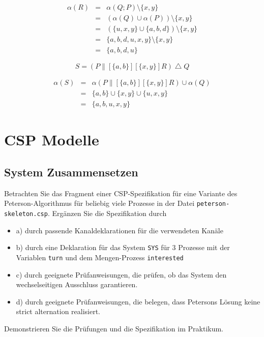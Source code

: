 \documentclass{scrreprt}
\begin{document}
\begin{eqnarray*}
  \alpha(R) &=& \alpha(Q; P) \setminus \{x, y\} \\
            &=& (\alpha(Q) \cup \alpha(P)) \setminus \{x, y\} \\
            &=& (\{u, x, y\} \cup \{a, b, d\}) \setminus \{x, y\} \\
            &=& \{a, b, d, u, x, y\} \setminus \{x, y\} \\
            &=& \{a, b, d, u\}
\end{eqnarray*}

\begin{equation}
  S = (P \parallel[\{a, b\}][\{x, y\}] R) \bigtriangleup Q
\end{equation}

\begin{eqnarray*}
  \alpha(S) &=& \alpha(P \parallel[\{a, b\}][\{x, y\}] R) \cup \alpha(Q) \\
            &=& \{a, b\} \cup \{x, y\} \cup \{u, x, y\} \\
            &=& \{a, b, u, x, y\}
\end{eqnarray*}


\chapter{CSP Modelle}
\section{System Zusammensetzen}

Betrachten Sie das Fragment einer CSP-Spezifikation für eine Variante des Peterson-Algorithmus für beliebig viele Prozesse in der Datei \texttt{peterson-skeleton.csp}. Ergänzen Sie die Spezifikation durch
\begin{itemize}
 \item a) durch passende Kanaldeklarationen für die verwendeten Kanäle
 \item b) durch eine Deklaration für das System \texttt{SYS} für 3 Prozesse mit der Variablen \texttt{turn} und dem Mengen-Prozess \texttt{interested}
 \item c) durch geeignete Prüfanweisungen, die prüfen, ob das System den wechselseitigen Ausschluss garantieren.
 \item d) durch geeignete Prüfanweisungen, die belegen, dass Petersons Lösung keine strict alternation realisiert.
\end{itemize}
Demonstrieren Sie die Prüfungen und die Spezifikation im Praktikum.
\end{document}
